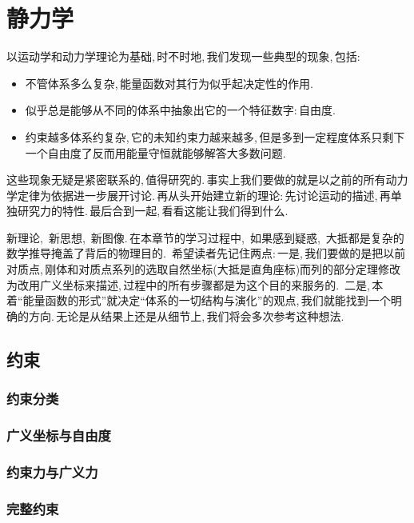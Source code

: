 \chapter{静力学}

以运动学和动力学理论为基础,\,时不时地,\,我们发现一些典型的现象,\,包括:
\begin{itemize}
	\item 不管体系多么复杂,\,能量函数对其行为似乎起决定性的作用.
	\item 似乎总是能够从不同的体系中抽象出它的一个特征数字:\,自由度.
	\item 约束越多体系约复杂,\,它的未知约束力越来越多,\,但是多到一定程度体系只剩下一个自由度了反而用能量守恒就能够解答大多数问题.
\end{itemize}

这些现象无疑是紧密联系的,\,值得研究的.\,事实上我们要做的就是以之前的所有动力学定律为依据进一步展开讨论.\,再从头开始建立新的理论:\,先讨论运动的描述,\,再单独研究力的特性.\,最后合到一起,\,看看这能让我们得到什么.

新理论,\, 新思想,\, 新图像.\,在本章节的学习过程中,\, 如果感到疑惑,\, 大抵都是复杂的数学推导掩盖了背后的物理目的.\, 希望读者先记住两点:\,一是,\,我们要做的是把以前对质点,\,刚体和对质点系列的选取自然坐标(大抵是直角座标)而列的部分定理修改为改用广义坐标来描述,\,过程中的所有步骤都是为这个目的来服务的.\, 二是,\,本着``能量函数的形式''就决定``体系的一切结构与演化''的观点,\,我们就能找到一个明确的方向.\,无论是从结果上还是从细节上,\,我们将会多次参考这种想法.

\section{约束}

\subsection{约束分类}

\subsection{广义坐标与自由度}

\subsection{约束力与广义力}

\subsection{完整约束}

